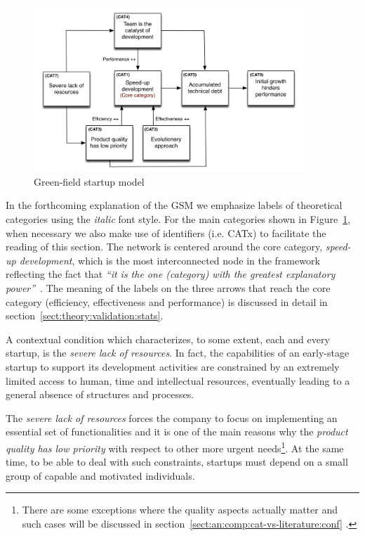 \documentclass[10pt,journal,letterpaper,compsoc]{IEEEtran}
\begin{document}
\begin{figure}[!t] 
\centering 
  \includegraphics[width=4in]{figures/high-level}
  \caption{Green-field startup model}\label{fig:gsm}
\end{figure}

In the forthcoming explanation of the GSM we emphasize labels of theoretical
categories using the \textit{italic} font style. For the main categories shown
in Figure~\ref{fig:gsm}, when necessary we also make use of identifiers (i.e.
CATx) to facilitate the reading of this section. The network is centered around
the core category, \textit{speed-up development}, which is the most
interconnected node in the framework reflecting the fact that \textit{``it is
the one (category) with the greatest explanatory power''}~\cite{Strauss1998}.
The meaning of the labels on the three arrows that reach the core category
(efficiency, effectiveness and performance) is discussed in detail in 
section~\ref{sect:theory:validation:stats}. 

A contextual condition which characterizes, to some extent, each and every
startup, is the \textit{severe lack of resources}. In fact, the capabilities of
an early-stage startup to support its development activities are constrained by
an extremely limited access to human, time and intellectual resources,
eventually leading to a general absence of structures and processes.

The \textit{severe lack of resources} forces the company to focus on
implementing an essential set of functionalities and it is one of the main
reasons why the \textit{product quality has low priority} with respect to other 
more urgent needs\footnote{There are some exceptions where the quality aspects
actually matter and such cases will be discussed in 
section~\ref{sect:an:comp:cat-vs-literature:conf}
.}. At the same time, to be able to deal with such constraints, startups must 
depend on a small group of capable and motivated individuals.
\end{document}
